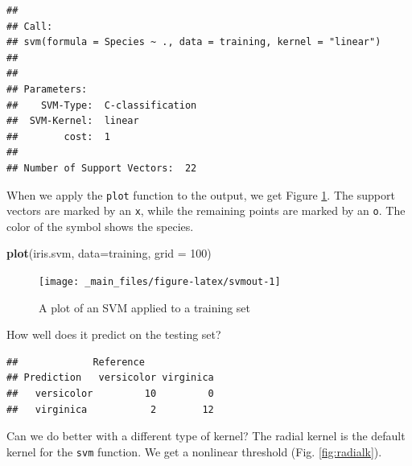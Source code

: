 \documentclass[
]{book}
\newenvironment{Shaded}{\begin{snugshade}}{\end{snugshade}}
\newcommand{\AttributeTok}[1]{\textcolor[rgb]{0.13,0.29,0.53}{#1}}
\newcommand{\DecValTok}[1]{\textcolor[rgb]{0.00,0.00,0.81}{#1}}
\newcommand{\FunctionTok}[1]{\textcolor[rgb]{0.13,0.29,0.53}{\textbf{#1}}}
\newcommand{\NormalTok}[1]{#1}
\newcommand{\OtherTok}[1]{\textcolor[rgb]{0.56,0.35,0.01}{#1}}
\newcommand{\SpecialCharTok}[1]{\textcolor[rgb]{0.81,0.36,0.00}{\textbf{#1}}}
\theoremstyle{definition}
\theoremstyle{definition}
\theoremstyle{definition}
\theoremstyle{definition}
\theoremstyle{remark}
\begin{document}
\begin{verbatim}
## 
## Call:
## svm(formula = Species ~ ., data = training, kernel = "linear")
## 
## 
## Parameters:
##    SVM-Type:  C-classification 
##  SVM-Kernel:  linear 
##        cost:  1 
## 
## Number of Support Vectors:  22
\end{verbatim}

When we apply the \texttt{plot} function to the output, we get Figure \ref{fig:svmout}. The support vectors are marked by an \texttt{x}, while the remaining points are marked by an \texttt{o}. The color of the symbol shows the species.

\begin{Shaded}
\begin{Highlighting}[]
\FunctionTok{plot}\NormalTok{(iris.svm, }\AttributeTok{data=}\NormalTok{training, }\AttributeTok{grid =} \DecValTok{100}\NormalTok{)}
\end{Highlighting}
\end{Shaded}

\begin{figure}

{\centering \texttt{[image: \_main\_files/figure-latex/svmout-1]} 

}

\caption{A plot of an SVM applied to a training set}\label{fig:svmout}
\end{figure}

How well does it predict on the testing set?

\begin{Shaded}
\end{Shaded}

\begin{verbatim}
##             Reference
## Prediction   versicolor virginica
##   versicolor         10         0
##   virginica           2        12
\end{verbatim}

Can we do better with a different type of kernel? The radial kernel is the default kernel for the \texttt{svm} function. We get a nonlinear threshold (Fig. \ref{fig:radialk}).
\end{document}

